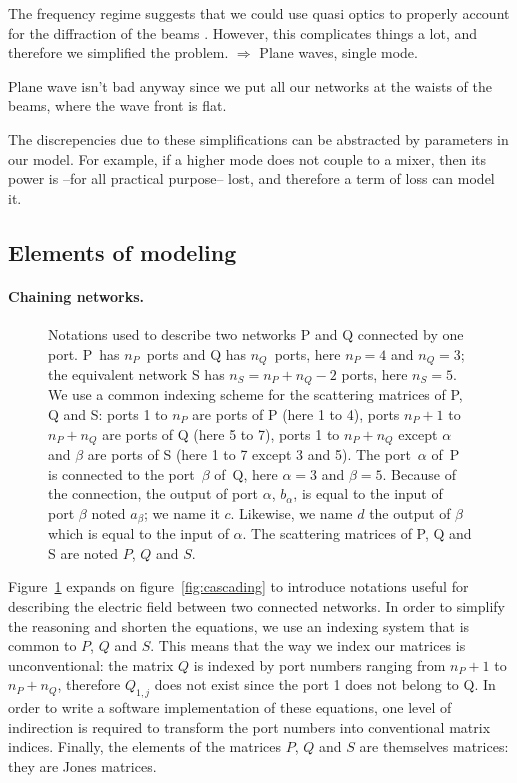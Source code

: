 \documentclass[a4paper,11pt]{article}
\begin{document}
The frequency regime suggests that we could use quasi optics to properly account for the diffraction of the beams \cite{goldsmith1998quasioptical}.
However, this complicates things a lot, and therefore we simplified the problem.
$\Rightarrow$ Plane waves, single mode.

Plane wave isn't bad anyway since we put all our networks at the waists of the beams, where the wave front is flat.

The discrepencies due to these simplifications can be abstracted by parameters in our model.
For example, if a higher mode does not couple to a mixer, then its power is --for all practical purpose-- lost, and therefore a term of loss can model it.


\subsection{Elements of modeling}
\paragraph{Chaining networks.}
\begin{figure}[hbtp]
    \centering
    
    \caption{\label{fig:between_networks}
        Notations used to describe two networks P and Q connected by one port.
        P~has $n_P$~ports and Q has $n_Q$~ports, here $n_P=4$ and $n_Q=3$;
        the equivalent network S has $n_S = n_P + n_Q - 2$ ports, here $n_S=5$.
        We use a common indexing scheme for the scattering matrices of P, Q and S:
        ports 1 to $n_P$ are ports of P (here 1 to 4),
        ports $n_P+1$ to $n_P+n_Q$ are ports of Q (here 5 to 7),
        ports 1 to $n_P+n_Q$ except $\alpha$ and $\beta$ are ports of S (here 1 to 7 except 3 and 5).
        The port~$\alpha$ of~P is connected to the port~$\beta$ of~Q, here $\alpha=3$ and $\beta=5$.
        Because of the connection, the output of port $\alpha$, $b_\alpha$, is equal to the input of port $\beta$ noted $a_\beta$; we name it $c$.  Likewise, we name $d$ the output of $\beta$ which is equal to the input of $\alpha$.
        The scattering matrices of P, Q and S are noted $P$, $Q$ and $S$.
        }
\end{figure}
Figure~\ref{fig:between_networks} expands on figure~\ref{fig:cascading} to introduce notations useful for describing the electric field between two connected networks.
In order to simplify the reasoning and shorten the equations, we use an indexing system that is common to $P$, $Q$ and $S$.  This means that the way we index our matrices is unconventional: the matrix $Q$ is indexed by port numbers ranging from $n_P+1$ to $n_P + n_Q$, therefore $Q_{1, j}$ does not exist since the port 1 does not belong to Q.  In order to write a software implementation of these equations, one level of indirection is required to transform the port numbers into conventional matrix indices.
Finally, the elements of the matrices $P$, $Q$ and $S$ are themselves matrices: they are Jones matrices.
\end{document}
